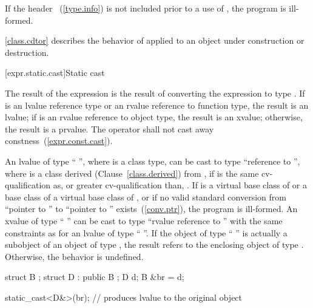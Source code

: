 \pnum
If the header ~(\ref{type.info}) is not included prior
to a use of , the program is ill-formed.

\pnum
\begin{note}
\ref{class.cdtor} describes the behavior of  applied to an
object under construction or destruction.
\end{note}

[expr.static.cast]{Static cast}

\pnum
{}%
%
The result of the expression  is the result of
converting the expression  to type .
%
%
If  is an lvalue reference type
or an rvalue reference to function type, the result is an lvalue;
if  is an rvalue reference to object type, the result is an xvalue;
otherwise, the result is a prvalue. The  operator shall not cast
away constness~(\ref{expr.const.cast}).

\pnum
{}%
%
An lvalue of type `` '', where  is a class
type, can be cast to type ``reference to  '', where
 is a class derived (Clause~\ref{class.derived}) from ,
if  is the
same cv-qualification as, or greater cv-qualification than,
. If  is a virtual base class of 
or a base class of a virtual base class of ,
or if no valid standard conversion from ``pointer to ''
to ``pointer to '' exists~(\ref{conv.ptr}), the program is ill-formed.
An xvalue of type
`` '' can be cast to type ``rvalue reference to
 '' with the same constraints as for an lvalue of
type `` ''. If the object
of type `` '' is actually a subobject of an object
of type , the result refers to the enclosing object of type
. Otherwise, the behavior is undefined.
\begin{example}

\begin{codeblock}
struct B { };
struct D : public B { };
D d;
B &br = d;

static_cast<D&>(br);            // produces lvalue to the original  object
\end{codeblock}
\end{example}

